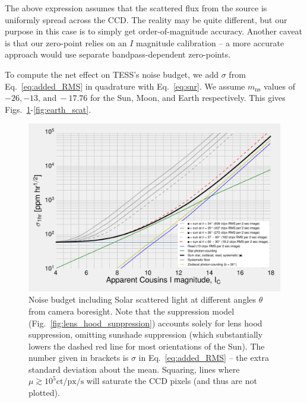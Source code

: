 The above expression assumes that the scattered flux from the source 
is uniformly spread across the CCD. The reality may be quite different,
but our purpose in this case is to simply get order-of-magnitude accuracy.
Another caveat is that our zero-point relies on an $I$ magnitude calibration -- 
a more accurate approach would use separate bandpass-dependent zero-points.

To compute the net effect on TESS's noise budget, we add $\sigma$ from 
Eq.~\ref{eq:added_RMS} in quadrature with Eq.~\ref{eq:snr}.
We assume $m_\mathrm{ns}$ values of $-26,-13,\,\mathrm{and}\ -17.76$ for the 
Sun, Moon, and Earth respectively.
This gives Figs.~\ref{fig:sun_scat}-\ref{fig:earth_scat}.

\begin{figure}[!h]
	\centering
	\includegraphics{figures/precision_angles_sun.pdf}
	\caption{Noise budget including Solar scattered light at different angles 
		$\theta$ from camera boresight. 
		Note that the suppression model 
		(Fig.~\protect\ref{fig:lens_hood_suppression}) 
		accounts solely for lens hood suppression, omitting sunshade 
		suppression (which substantially lowers the dashed red line for most
		orientations of the Sun).
		The number given in brackets is $\sigma$ in 
		Eq.~\protect\ref{eq:added_RMS} --
		the extra standard deviation about the mean.
		Squaring, lines where $\mu \gtrsim 10^5 \mathrm{ct/px/s}$ will saturate 
		the CCD pixels (and thus are not plotted).} 
	\label{fig:sun_scat}
\end{figure}
